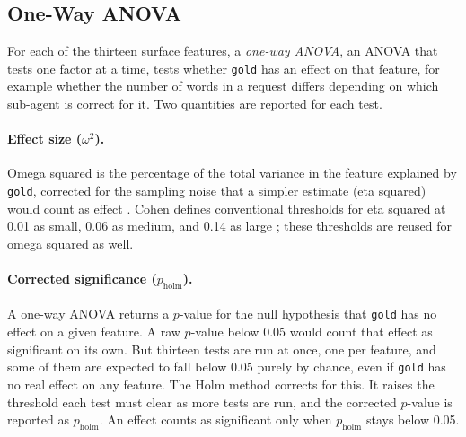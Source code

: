 \subsection{One-Way ANOVA}
\label{subsec:anova-oneway}

For each of the thirteen surface features, a \emph{one-way ANOVA}, an ANOVA that tests one factor at a time, tests whether \texttt{gold} has an effect on that feature, for example whether the number of words in a request differs depending on which sub-agent is correct for it. Two quantities are reported for each test.

\paragraph{Effect size ($\omega^2$).} Omega squared is the percentage of the total variance in the feature explained by \texttt{gold}, corrected for the sampling noise that a simpler estimate (eta squared) would count as effect \citep{olejnikGeneralizedEtaOmega2003}. Cohen defines conventional thresholds for eta squared at 0.01 as small, 0.06 as medium, and 0.14 as large \citep{cohenStatisticalPowerAnalysis2013}; these thresholds are reused for omega squared as well.

\paragraph{Corrected significance ($p_{\text{holm}}$).} A one-way ANOVA returns a $p$-value for the null hypothesis that \texttt{gold} has no effect on a given feature. A raw $p$-value below 0.05 would count that effect as significant on its own. But thirteen tests are run at once, one per feature, and some of them are expected to fall below 0.05 purely by chance, even if \texttt{gold} has no real effect on any feature. The Holm method \citep{holmSimpleSequentiallyRejective1979} corrects for this. It raises the threshold each test must clear as more tests are run, and the corrected $p$-value is reported as $p_{\text{holm}}$. An effect counts as significant only when $p_{\text{holm}}$ stays below 0.05.

\bigskip

